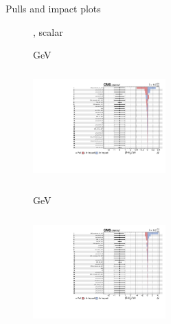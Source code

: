 \documentclass[8pt]{beamer}
\begin{document}
\begin{frame}{Pulls and impact plots}
\justifying
\begin{figure}[htbp]
\centering
\begin{block}{, scalar}\end{block}	\vspace{-8pt}

\begin{minipage}[b]{0.49\textwidth}
\begin{center}
\centering \begin{block}{ GeV}\end{block}	
\includegraphics[width=5.1cm, height=4.2cm]{figs/2017/impacts_2017_both_scalar_100.pdf}
\end{center}
\end{minipage}\hfill
\begin{minipage}[b]{0.49\textwidth}
\begin{center}
\centering \begin{block}{ GeV}\end{block}	
\includegraphics[width=5.1cm, height=4.2cm]{figs/2017/impacts_2017_both_scalar_500.pdf}
\end{center}
\end{minipage} \hfill
\end{figure}
\end{frame}
\end{document}
